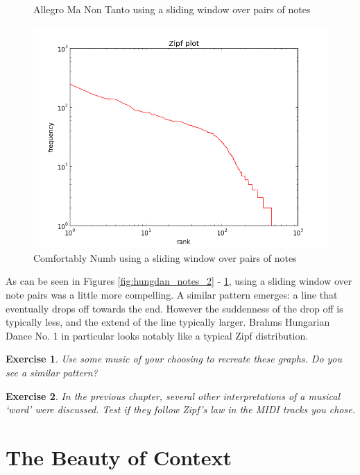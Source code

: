 \documentclass[10pt]{book}
\newtheorem{exercise}{Exercise}[chapter]
\begin{document}
\begin{figure}[!htb]
  \caption{Allegro Ma Non Tanto using a sliding window over pairs of notes}\label{fig:rach_notes_2}
\endminipage\hfill
{}%
  \includegraphics[width=\linewidth]{comf_notes_2}
  \caption{Comfortably Numb using a sliding window over pairs of notes}\label{fig:comf_notes_2}
\endminipage
\end{figure}

As can be seen in Figures \ref{fig:hungdan_notes_2} - \ref{fig:comf_notes_2}, using a sliding window over note pairs was a little more compelling. A similar pattern emerges: a line that eventually drops off towards the end. However the suddenness of the drop off is typically less, and the extend of the line typically larger. Brahms Hungarian Dance No. 1 in particular looks notably like a typical Zipf distribution.


\begin{exercise}
Use some music of your choosing to recreate these graphs. Do you see a similar pattern?
\end{exercise}

\begin{exercise}
In the previous chapter, several other interpretations of a musical `word' were discussed. Test if they follow Zipf's law in the MIDI tracks you chose.
\end{exercise}



\section{The Beauty of Context}
\end{document}
